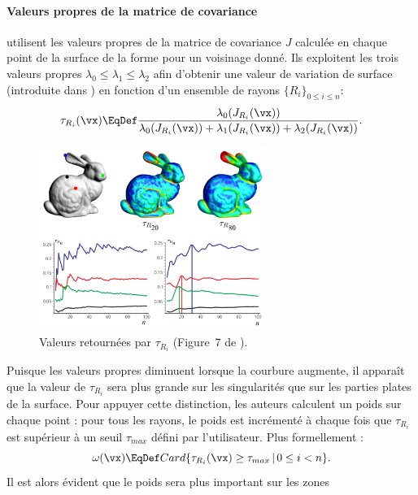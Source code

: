 \paragraph{Valeurs propres de la matrice de covariance}
%
 utilisent les valeurs propres de la matrice de
covariance $J$ calculée en chaque point de la surface de la forme pour un voisinage
donné. Ils exploitent les trois valeurs propres $\lambda_0 \leq \lambda_1 \leq
\lambda_2$ afin d'obtenir une valeur de variation de surface (introduite dans
\cite{Pauly2002}) en fonction d'un ensemble de rayons $\{ R_i \}_{0 \le i \le n}$:
%
\begin{equation}
  \tau_{R_i}(\vx) \EqDef \frac{\lambda_0(J_{R_i}(\vx))}{\lambda_0(J_{R_i}(\vx)) + \lambda_1(J_{R_i}(\vx)) + \lambda_2(J_{R_i}(\vx))}.
\end{equation}
%
\begin{figure}[ht]{
  \begin{center}
    \includegraphics[height=6cm]{images/Feature/PaulyTau}
  \end{center}}
    \caption[Valeurs retournées par $\tau_{R_i}$.]{Valeurs retournées par $\tau_{R_i}$ (Figure~7 de \cite{Pauly2003}).
    \label{fig:pauly-tau}}
\end{figure}
%
Puisque les valeurs propres diminuent lorsque la courbure augmente, il apparaît
que la valeur de $\tau_{R_i}$ sera plus grande sur les singularités que sur les parties
plates de la surface. Pour appuyer cette distinction, les auteurs calculent un
poids sur chaque point : pour tous les rayons, le poids est incrémenté à chaque
fois que $\tau_{R_i}$ est supérieur à un seuil $\tau_{max}$ défini par
l'utilisateur. Plus formellement :
%
\begin{equation}
  \label{eq:pauly-omega}
  \omega(\vx) \EqDef Card \{ \tau_{R_i}(\vx) \geq \tau_{max}\,|\,0\leq i < n \}.
\end{equation}
%
Il est alors évident que le poids sera plus important sur les zones
